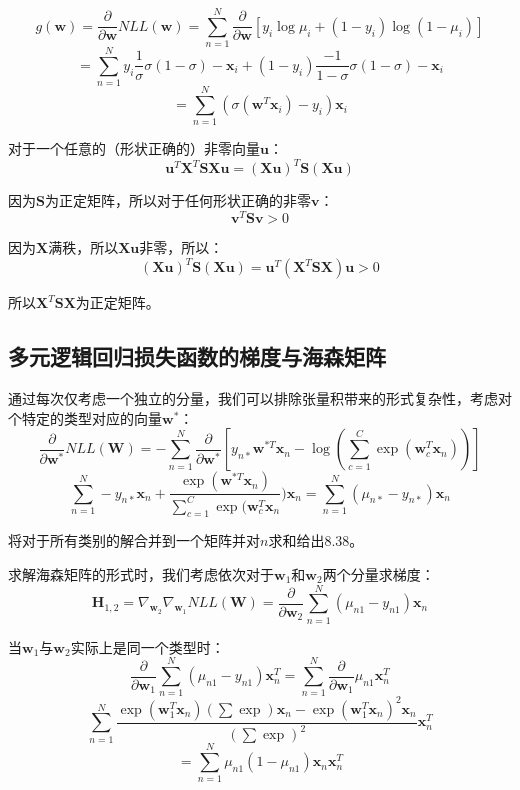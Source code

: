 \documentclass[UTF8]{ctexart}
\begin{document}
$$g(\textbf{w})=\frac{\partial}{\partial \textbf{w}}NLL(\textbf{w}) =\sum_{n=1}^{N}\frac{\partial}{\partial \textbf{w}} [y_{i}\log \mu_{i} + (1-y_{i})\log (1-\mu_{i})] $$
$$=\sum_{n=1}^{N}y_{i}\frac{1}{\sigma}\sigma(1-\sigma)-\textbf{x}_{i}+(1-y_{i})\frac{-1}{1-\sigma}\sigma(1-\sigma)-\textbf{x}_{i}$$
$$=\sum_{n=1}^{N}(\sigma(\textbf{w}^{T}\textbf{x}_{i})-y_{i})\textbf{x}_{i}$$

对于一个任意的（形状正确的）非零向量$\textbf{u}$：
$$\textbf{u}^{T}\textbf{X}^{T}\textbf{S}\textbf{X}\textbf{u}=(\textbf{X}\textbf{u})^{T}\textbf{S}(\textbf{X}\textbf{u})$$

因为$\textbf{S}$为正定矩阵，所以对于任何形状正确的非零$\textbf{v}$：
$$\textbf{v}^{T}\textbf{S}\textbf{v} > 0$$

因为$\textbf{X}$满秩，所以$\textbf{X}\textbf{u}$非零，所以：
$$(\textbf{X}\textbf{u})^{T}\textbf{S}(\textbf{X}\textbf{u}) = \textbf{u}^{T}(\textbf{X}^{T}\textbf{S}\textbf{X})\textbf{u} > 0$$

所以$\textbf{X}^{T}\textbf{S}\textbf{X}$为正定矩阵。

\subsection{多元逻辑回归损失函数的梯度与海森矩阵}
通过每次仅考虑一个独立的分量，我们可以排除张量积带来的形式复杂性，考虑对个特定的类型对应的向量$\textbf{w}^{*}$：
$$\frac{\partial}{\partial \textbf{w}^{*}}NLL(\textbf{W}) = -\sum_{n=1}^{N}\frac{\partial}{\partial \textbf{w}^{*}} [y_{n*}\textbf{w}^{*T}\textbf{x}_{n}-\log(\sum_{c=1}^{C}\exp(\textbf{w}_{c}^{T}\textbf{x}_{n}))]$$
$$\sum_{n=1}^{N}-y_{n*}\textbf{x}_{n}+\frac{\exp(\textbf{w}^{*T}\textbf{x}_{n})}{\sum_{c=1}^{C}\exp(\textbf{w}_{c}^{T}\textbf{x}_{n}})\textbf{x}_{n}=\sum_{n=1}^{N}(\mu_{n*}-y_{n*})\textbf{x}_{n}$$

将对于所有类别的解合并到一个矩阵并对$n$求和给出8.38。

求解海森矩阵的形式时，我们考虑依次对于$\textbf{w}_{1}$和$\textbf{w}_{2}$两个分量求梯度：
$$\textbf{H}_{1,2}=\nabla_{\textbf{w}_{2}}\nabla_{\textbf{w}_{1}}NLL(\textbf{W})=\frac{\partial}{\partial \textbf{w}_{2}} \sum_{n=1}^{N}(\mu_{n1}-y_{n1})\textbf{x}_{n}  $$

当$\textbf{w}_{1}$与$\textbf{w}_{2}$实际上是同一个类型时：
$$\frac{\partial}{\partial \textbf{w}_{1}} \sum_{n=1}^{N}(\mu_{n1}-y_{n1})\textbf{x}_{n}^{T}=\sum_{n=1}^{N}\frac{\partial}{\partial \textbf{w}_{1}}\mu_{n1}\textbf{x}_{n}^{T}$$
$$\sum_{n=1}^{N}\frac{\exp(\textbf{w}_{1}^{T}\textbf{x}_{n})(\sum \exp)\textbf{x}_{n}-\exp(\textbf{w}_{1}^{T}\textbf{x}_{n})^{2}\textbf{x}_{n}}{(\sum \exp)^{2}}\textbf{x}_{n}^{T}$$
$$=\sum_{n=1}^{N}\mu_{n1}(1-\mu_{n1})\textbf{x}_{n}\textbf{x}_{n}^{T}$$
\end{document}
